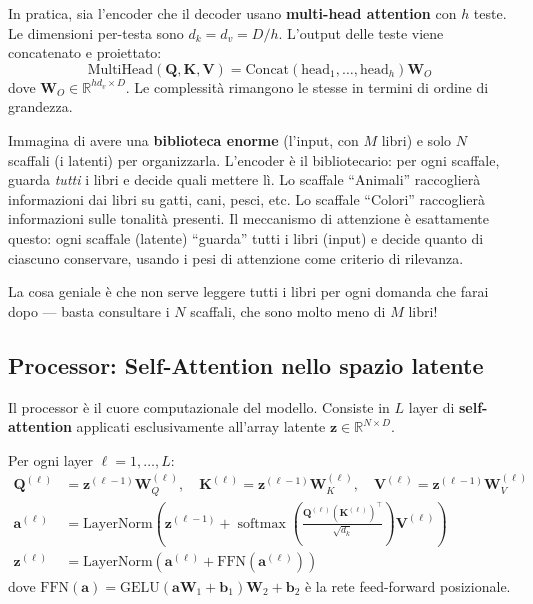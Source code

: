 \documentclass[12pt,a4paper]{article}
\begin{document}
\begin{notabox}
In pratica, sia l'encoder che il decoder usano \textbf{multi-head attention} con $h$ teste. Le dimensioni per-testa sono $d_k = d_v = D/h$. L'output delle teste viene concatenato e proiettato:
\[
\text{MultiHead}(\mathbf{Q}, \mathbf{K}, \mathbf{V}) = \text{Concat}(\text{head}_1, \ldots, \text{head}_h)\mathbf{W}_O
\]
dove $\mathbf{W}_O \in \mathbb{R}^{hd_v \times D}$. Le complessit\`a rimangono le stesse in termini di ordine di grandezza.
\end{notabox}

\begin{notabox}
Immagina di avere una \textbf{biblioteca enorme} (l'input, con $M$ libri) e solo $N$ scaffali (i latenti) per organizzarla. L'encoder \`e il bibliotecario: per ogni scaffale, guarda \emph{tutti} i libri e decide quali mettere l\`i. Lo scaffale ``Animali'' raccoglier\`a informazioni dai libri su gatti, cani, pesci, etc. Lo scaffale ``Colori'' raccoglier\`a informazioni sulle tonalit\`a presenti. Il meccanismo di attenzione \`e esattamente questo: ogni scaffale (latente) ``guarda'' tutti i libri (input) e decide quanto di ciascuno conservare, usando i pesi di attenzione come criterio di rilevanza.

La cosa geniale \`e che non serve leggere tutti i libri per ogni domanda che farai dopo --- basta consultare i $N$ scaffali, che sono molto meno di $M$ libri!
\end{notabox}


\subsection{Processor: Self-Attention nello spazio latente}

Il processor \`e il cuore computazionale del modello. Consiste in $L$ layer di \textbf{self-attention} applicati esclusivamente all'array latente $\mathbf{z} \in \mathbb{R}^{N \times D}$.

\begin{formulabox}
Per ogni layer $\ell = 1, \ldots, L$:
\begin{align}
    \mathbf{Q}^{(\ell)} &= \mathbf{z}^{(\ell-1)} \mathbf{W}_Q^{(\ell)}, \quad
    \mathbf{K}^{(\ell)} = \mathbf{z}^{(\ell-1)} \mathbf{W}_K^{(\ell)}, \quad
    \mathbf{V}^{(\ell)} = \mathbf{z}^{(\ell-1)} \mathbf{W}_V^{(\ell)} \\[4pt]
    \mathbf{a}^{(\ell)} &= \text{LayerNorm}\!\left(\mathbf{z}^{(\ell-1)} + \operatorname{softmax}\!\left(\frac{\mathbf{Q}^{(\ell)} (\mathbf{K}^{(\ell)})^\top}{\sqrt{d_k}}\right) \mathbf{V}^{(\ell)}\right) \\[4pt]
    \mathbf{z}^{(\ell)} &= \text{LayerNorm}\!\left(\mathbf{a}^{(\ell)} + \text{FFN}(\mathbf{a}^{(\ell)})\right)
\end{align}
dove $\text{FFN}(\mathbf{a}) = \text{GELU}(\mathbf{a}\mathbf{W}_1 + \mathbf{b}_1)\mathbf{W}_2 + \mathbf{b}_2$ \`e la rete feed-forward posizionale.
\end{formulabox}
\end{document}
